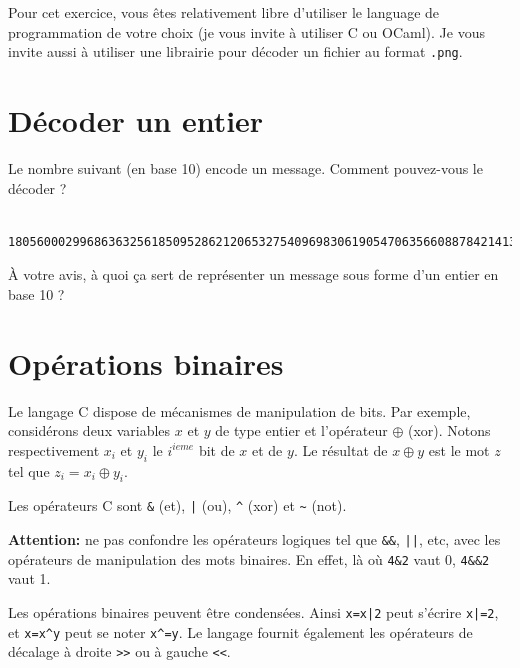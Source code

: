\documentclass[11pt]{article}
\begin{document}
Pour cet exercice, vous êtes relativement libre d'utiliser le language de programmation de votre choix (je vous invite à utiliser C ou OCaml). Je vous invite aussi à utiliser une librairie pour décoder un fichier au format \texttt{.png}.

\section{Décoder un entier}

Le nombre suivant (en base 10) encode un message. Comment pouvez-vous le décoder ?
\begin{verbatim}
  18056000299686363256185095286212065327540969830619054706356608878421413059579270545913845431718826564612867924226501704759373213690067220168228194519515223623063568138322186827982892004398
\end{verbatim}

À votre avis, à quoi ça sert de représenter un message sous forme d'un entier en base 10 ?

\section{Opérations binaires}

Le langage C dispose de mécanismes de manipulation de bits. Par exemple,
considérons deux variables $x$ et $y$ de type entier et l'opérateur $\oplus$
(xor). Notons respectivement $x_i$ et $y_i$ le $i^{ieme}$ bit de $x$ et de $y$.
Le résultat de $x \oplus y$ est le mot $z$ tel que $z_i = x_i \oplus y_i$.

Les opérateurs C sont \verb+&+ (et), \verb+|+ (ou), \verb+^+ (xor) et \verb+~+ (not).

\noindent \textbf{Attention:} ne pas confondre les opérateurs logiques tel que
\verb+&&+, \verb+||+, etc, avec les opérateurs de manipulation
des mots binaires. En effet, là où \verb+4&2+ vaut 0, \verb+4&&2+ vaut 1.

Les opérations binaires peuvent être condensées. Ainsi \verb+x=x|2+
peut s'écrire \verb+x|=2+, et \verb+x=x^y+ peut se noter \verb+x^=y+.
Le langage fournit également les opérateurs de décalage à droite \verb+>>+
ou à gauche \verb+<<+.
\end{document}
